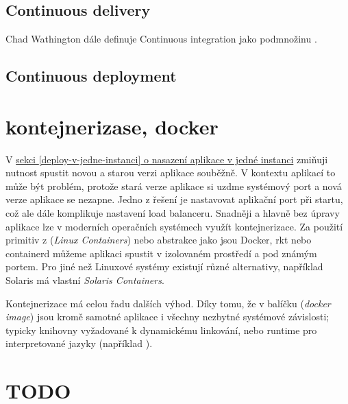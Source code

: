         \subsection{Continuous delivery}
            Chad Wathington dále definuje Continuous integration jako podmnožinu \CD \cite{fowler-go}.
            \blind[2]

        \subsection{Continuous deployment}
            \blind[2]

    \section{kontejnerizase, docker}
        V \hyperref[deploy-v-jedne-instanci]{sekci \ref*{deploy-v-jedne-instanci} o nasazení aplikace v jedné instanci} zmiňuji nutnost spustit novou a starou verzi aplikace souběžně. V kontextu \HTTP aplikací to může být problém, protože stará verze aplikace si uzdme systémový port a nová verze aplikace se nezapne. Jedno z řešení je nastavovat aplikační port při startu, což ale dále komplikuje nastavení load balanceru. Snadněji a hlavně bez úpravy aplikace lze v moderních operačních systémech využít kontejnerizace. Za použití primitiv z  (\textit{Linux Containers}) nebo abstrakce jako jsou Docker, rkt nebo containerd můžeme aplikaci spustit v izolovaném prostředí a pod známým portem. Pro jiné než Linuxové systémy existují různé alternativy, například Solaris má vlastní \textit{Solaris Containers}.

        Kontejnerizace má celou řadu dalších výhod. Díky tomu, že v balíčku (\textit{docker image}) jsou kromě samotné aplikace i všechny nezbytné systémové závislosti; typicky knihovny vyžadované k dynamickému linkování, nebo runtime pro interpretované jazyky (například ).

        \blind[1]

        \blind[2]

   \section{TODO}
